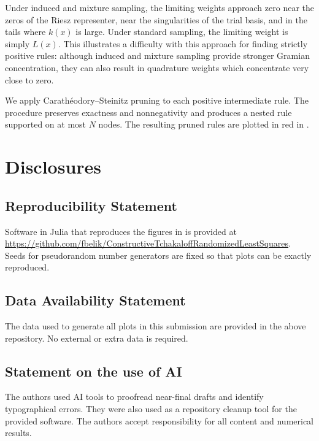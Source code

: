 \documentclass[10pt,dvipsnames]{amsart}
\begin{document}
Under induced and mixture sampling, the limiting weights approach zero near the zeros of the Riesz representer, near the singularities of the trial basis, and in the tails where \(k(x)\) is large. Under standard sampling, the limiting weight is simply \(L(x)\). This illustrates a difficulty with this approach for finding strictly positive rules: although induced and mixture sampling provide stronger Gramian concentration, they can also result in quadrature weights which concentrate very close to zero. 

We apply Carath\'eodory--Steinitz pruning to each positive intermediate rule. The procedure preserves exactness and nonnegativity and produces a nested rule supported on at most \(N\) nodes. The resulting pruned rules are plotted in red in .


\section{Disclosures}\label{sec:disclosures}

\subsection{Reproducibility Statement}
\label{ssec:reproducibility}

Software in Julia that reproduces the figures in  is provided at \url{https://github.com/fbelik/ConstructiveTchakaloffRandomizedLeastSquares}. Seeds for pseudorandom number generators are fixed so that plots can be exactly reproduced.

\subsection{Data Availability Statement}
\label{ssec:data}
The data used to generate all plots in this submission are provided in the above repository. No external or extra data is required.

\subsection{Statement on the use of AI}
\label{ssec:ai-statement}

The authors used AI tools to proofread near-final drafts and identify typographical errors. They were also used as a repository cleanup tool for the provided software. The authors accept responsibility for all content and numerical results.
\end{document}
